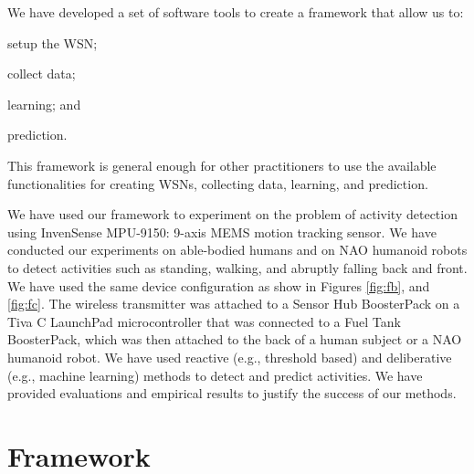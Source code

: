 \documentclass[letterpaper]{article}
\begin{document}
We have developed a set of software tools to create a framework that allow us to: 
\begin{inparaenum}[1)] \item setup the WSN; \item collect data; \item learning; and \item 
prediction. \end{inparaenum} This framework is general enough for other practitioners to use the
available functionalities for creating WSNs, collecting data, learning, and prediction.



We have used our framework to experiment on the problem of activity detection using InvenSense 
MPU-9150: 9-axis MEMS motion tracking sensor. We have conducted our experiments on able-bodied 
humans and on NAO humanoid robots to detect activities such as standing, walking, and abruptly 
falling back and front. We have used the same device configuration as show in Figures \ref{fig:fb}, 
and \ref{fig:fc}. The wireless transmitter was attached to a Sensor Hub BoosterPack on a Tiva C 
LaunchPad microcontroller that was connected to a Fuel Tank BoosterPack, which was then attached to 
the back of a human subject or a NAO humanoid robot. We have used reactive (e.g., threshold based) 
and deliberative (e.g., machine learning) methods to detect and predict activities. We have 
provided  evaluations and empirical results to  justify the success of our methods. 


\section{Framework}
\end{document}
